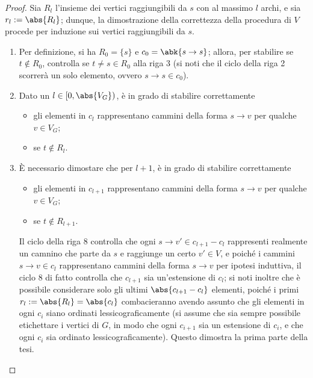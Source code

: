 \documentclass[a4paper, 12pt]{report}
\begin{document}
\begin{proof}
        Sia $R_l$ l'insieme dei vertici raggiungibili da $s$ con al massimo $l$ archi, e sia $r_l := \abs{R_l}$; dunque, la dimostrazione della correttezza della procedura  di $V$ procede per induzione sui vertici raggiungibili da $s$.

            \begin{enumerate}[label=]
                \item {} Per definizione, si ha $R_0 = \{ s\}$ e $c_0 = \abk{s \to s}$; allora, per stabilire se $t \notin R_0$,  controlla se $t \neq s \in R_0$ alla riga 3 (si noti che il ciclo della riga 2 scorrerà un solo elemento, ovvero $s \to s \in c_0$).
                \item {} Dato un $l \in [0, \abs{V_G})$,  è in grado di stabilire correttamente

                    \begin{itemize}
                        \item gli elementi in $c_l$ rappresentano cammini della forma $s \to v$ per qualche $v \in V_G$;
                        \item se $t \notin R_l$.
                    \end{itemize} 

                \item {} È necessario dimostare che per $l+1$,  è in grado di stabilire correttamente

                    \begin{itemize}
                        \item gli elementi in $c_{l + 1}$ rappresentano cammini della forma $s \to v$ per qualche $v \in V_G$;
                        \item se $t \notin R_{l + 1}$.
                    \end{itemize}

                    Il ciclo della riga 8 controlla che ogni $s \to v' \in c_{l + 1} - c_l$ rappresenti realmente un camnino che parte da $s$ e raggiunge un certo $v' \in V$, e poiché i cammini $s \to v \in c_l$ rappresentano cammini della forma $s \to v$ per ipotesi induttiva, il ciclo 8 di fatto controlla che $c_{l + 1}$ sia un'estensione di $c_l$; si noti inoltre che è possibile considerare solo gli ultimi $\abs{c_{l +1} - c_l}$ elementi, poiché i primi $r_l := \abs{R_l} = \abs{c_l}$ combacieranno avendo assunto che gli elementi in ogni $c_i$ siano ordinati lessicograficamente (si assume che sia sempre possibile etichettare i vertici di $G$, in modo che ogni $c_{i +1 }$ sia un estensione di $c_i$, e che ogni $c_i$ sia ordinato lessicograficamente). Questo dimostra la prima parte della tesi.


\end{enumerate}
\end{proof}
\end{document}
